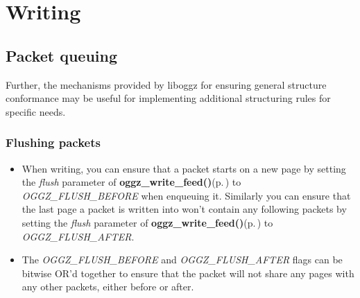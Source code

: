\section{Writing}
\label{group__writing}
\subsection{Packet queuing}\label{hungry}
Further, the mechanisms provided by liboggz for ensuring general structure conformance may be useful for implementing additional structuring rules for specific needs.\subsubsection{Flushing packets}\label{flushing}
\begin{itemize}
\item When writing, you can ensure that a packet starts on a new page by setting the {\em flush\/} parameter of {\bf oggz\_\-write\_\-feed()}{\rm (p.\,\pageref{group__write__api_a2})} to {\em OGGZ\_\-FLUSH\_\-BEFORE\/} when enqueuing it. Similarly you can ensure that the last page a packet is written into won't contain any following packets by setting the {\em flush\/} parameter of {\bf oggz\_\-write\_\-feed()}{\rm (p.\,\pageref{group__write__api_a2})} to {\em OGGZ\_\-FLUSH\_\-AFTER\/}.\item The {\em OGGZ\_\-FLUSH\_\-BEFORE\/} and {\em OGGZ\_\-FLUSH\_\-AFTER\/} flags can be bitwise OR'd together to ensure that the packet will not share any pages with any other packets, either before or after. \end{itemize}


